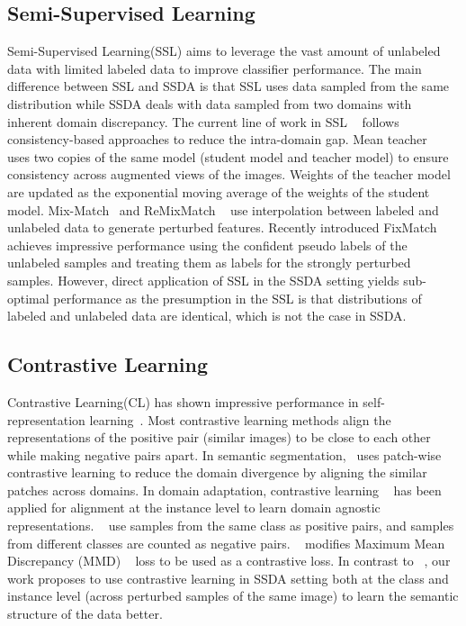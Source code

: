 \subsection{Semi-Supervised Learning}
Semi-Supervised Learning(SSL) aims to leverage the vast amount of unlabeled data with limited labeled data to improve classifier performance. The main difference between SSL and SSDA is that SSL uses data sampled from the same distribution while SSDA deals with data sampled from two domains with inherent domain discrepancy.
The current line of work in SSL ~\cite{Sohn2020FixMatchSS, Berthelot2019MixMatchAH, Li2017TripleGA, Dai2017GoodSL} follows consistency-based approaches to reduce the intra-domain gap. Mean teacher ~\cite{Tarvainen2017MeanTA} uses two copies of the same model (student model and teacher model) to ensure consistency across augmented views of the images. Weights of the teacher model are updated as the exponential moving average of the weights of the student model. Mix-Match~\cite{Berthelot2019MixMatchAH} and ReMixMatch ~\cite{Berthelot2020ReMixMatchSL}  use interpolation between labeled and unlabeled data to generate perturbed features. Recently introduced FixMatch ~\cite{Sohn2020FixMatchSS} achieves impressive performance using the confident pseudo labels of the unlabeled samples and treating them as labels for the strongly perturbed samples. However, direct application of SSL in the SSDA setting yields sub-optimal performance as the presumption in the SSL is that distributions of labeled and unlabeled data are identical, which is not the case in SSDA.

\subsection{Contrastive Learning}
Contrastive Learning(CL) has shown impressive performance in self-representation learning~\cite{Chen2020ASF, Bachman2019LearningRB,He2020MomentumCF, Tian2020ContrastiveMC, Oord2018RepresentationLW}. Most contrastive learning methods align the representations of the positive pair (similar images) to be close to each other while making negative pairs apart. In semantic segmentation,~\cite{Liu2021DomainAF} uses patch-wise contrastive learning to reduce the domain divergence by aligning the similar patches across domains. In domain adaptation, contrastive learning ~\cite{Kim2020CrossdomainSL, Kang2019ContrastiveAN} has been applied for alignment at the instance level to learn domain agnostic representations. ~\cite{Kang2019ContrastiveAN, Kim2020CrossdomainSL} use samples from the same class as positive pairs, and samples from different classes are counted as negative pairs.  ~\cite{Kang2019ContrastiveAN}  modifies Maximum Mean Discrepancy (MMD) ~\cite{Gretton2012AKT} loss to be used as a contrastive loss. In contrast to ~\cite{Kim2020CrossdomainSL, Kang2019ContrastiveAN}, our work proposes to use contrastive learning in SSDA setting both at the class and instance level (across perturbed samples of the same image) to learn the semantic structure of the data better.

